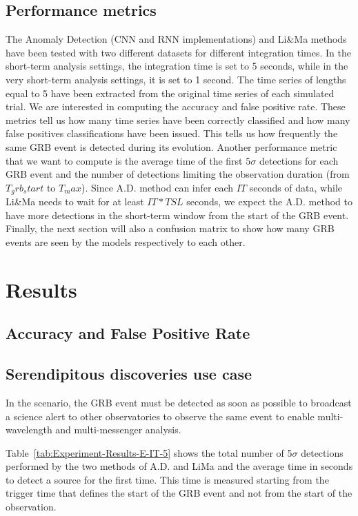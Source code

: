 \subsection{Performance metrics}
\label{s:Peformance-Metrics}
The Anomaly Detection (CNN and RNN implementations) and Li\&Ma methods have been tested with two different datasets for different integration times. In the short-term analysis settings, the integration time is set to 5 seconds, while in the very short-term analysis settings, it is set to 1 second. The time series of lengths equal to 5 have been extracted from the original time series of each simulated trial. We are interested in computing the accuracy and false positive rate. These metrics tell us how many time series have been correctly classified and how many false positives classifications have been issued. This tells us how frequently the same GRB event is detected during its evolution. Another performance metric that we want to compute is the average time of the first $5\sigma$ detections for each GRB event and the number of detections limiting the observation duration (from $T_grb_start$ to $T_max$). Since A.D. method can infer each $IT$ seconds of data, while Li\&Ma needs to wait for at least $IT*TSL$ seconds, we expect the A.D. method to have more detections in the short-term window from the start of the GRB event. Finally, the next section will also a confusion matrix to show how many GRB events are seen by the models respectively to each other. 


\section{Results}
\label{s:Experiment-Results}

\subsection{Accuracy and False Positive Rate}
\label{s:Acc-Fpr}

\subsection{Serendipitous discoveries use case}
\label{s:Serendipitous-Discoveries-Results}
In the scenario, the GRB event must be detected as soon as possible to broadcast a science alert to other observatories to observe the same event to enable multi-wavelength and multi-messenger analysis. 

Table~\ref{tab:Experiment-Results-E-IT-5} shows the total number of 5$\sigma$ detections performed by the two methods of A.D. and LiMa and the average time in seconds to detect a source for the first time. This time is measured starting from the trigger time that defines the start of the GRB event and not from the start of the observation.

